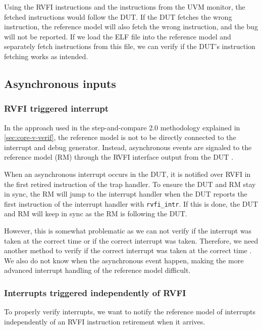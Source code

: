 Using the RVFI instructions and the instructions from the UVM monitor, the fetched instructions would follow the DUT. If the DUT fetches the wrong instruction, the reference model will also fetch the wrong instruction, and the bug will not be reported. If we load the ELF file into the reference model and separately fetch instructions from this file, we can verify if the DUT's instruction fetching works as intended. 

\subsection{Asynchronous inputs}

\subsubsection{RVFI triggered interrupt}

In the approach used in the step-and-compare 2.0 methodology explained in \cref{sec:core-v-verif}, the reference model is not to be directly connected to the interrupt and debug generator. Instead, asynchronous events are signaled to the reference model (RM) through the RVFI interface output from the DUT \cite{taylor_advanced_2023}.

When an asynchronous interrupt occurs in the DUT, it is notified over RVFI in the first retired instruction of the trap handler. To ensure the DUT and RM stay in sync, the RM will jump to the interrupt handler when the DUT reports the first instruction of the interrupt handler with \lstinline{rvfi_intr}.  If this is done, the DUT and RM will keep in sync as the RM is following the DUT.

However, this is somewhat problematic as we can not verify if the interrupt was taken at the correct time or if the correct interrupt was taken. Therefore, we need another method to verify if the correct interrupt was taken at the correct time \cite{taylor_advanced_2023}.
We also do not know when the asynchronous event happen, making the more advanced interrupt handling of the reference model difficult. 

\subsubsection{Interrupts triggered independently of RVFI}

To properly verify interrupts, we want to notify the reference model of interrupts independently of an RVFI instruction retirement when it arrives. 

